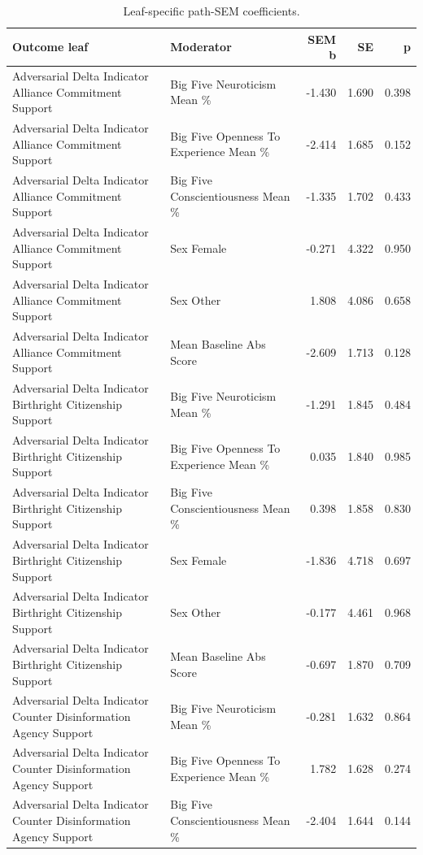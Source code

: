 \begin{table}[htbp]
\raggedright
\caption{Leaf-specific path-SEM coefficients.}
\label{tab:sempaths}
{
\footnotesize
\setlength{\tabcolsep}{4pt}
\renewcommand{\arraystretch}{1.08}
\begin{tabular}{llrrr}
\toprule
Outcome leaf & Moderator & SEM b & SE & p \\
\midrule
Adversarial Delta Indicator Alliance Commitment Support & Big Five Neuroticism Mean \% & -1.430 & 1.690 & 0.398 \\
Adversarial Delta Indicator Alliance Commitment Support & Big Five Openness To Experience Mean \% & -2.414 & 1.685 & 0.152 \\
Adversarial Delta Indicator Alliance Commitment Support & Big Five Conscientiousness Mean \% & -1.335 & 1.702 & 0.433 \\
Adversarial Delta Indicator Alliance Commitment Support & Sex Female & -0.271 & 4.322 & 0.950 \\
Adversarial Delta Indicator Alliance Commitment Support & Sex Other & 1.808 & 4.086 & 0.658 \\
Adversarial Delta Indicator Alliance Commitment Support & Mean Baseline Abs Score & -2.609 & 1.713 & 0.128 \\
Adversarial Delta Indicator Birthright Citizenship Support & Big Five Neuroticism Mean \% & -1.291 & 1.845 & 0.484 \\
Adversarial Delta Indicator Birthright Citizenship Support & Big Five Openness To Experience Mean \% & 0.035 & 1.840 & 0.985 \\
Adversarial Delta Indicator Birthright Citizenship Support & Big Five Conscientiousness Mean \% & 0.398 & 1.858 & 0.830 \\
Adversarial Delta Indicator Birthright Citizenship Support & Sex Female & -1.836 & 4.718 & 0.697 \\
Adversarial Delta Indicator Birthright Citizenship Support & Sex Other & -0.177 & 4.461 & 0.968 \\
Adversarial Delta Indicator Birthright Citizenship Support & Mean Baseline Abs Score & -0.697 & 1.870 & 0.709 \\
Adversarial Delta Indicator Counter Disinformation Agency Support & Big Five Neuroticism Mean \% & -0.281 & 1.632 & 0.864 \\
Adversarial Delta Indicator Counter Disinformation Agency Support & Big Five Openness To Experience Mean \% & 1.782 & 1.628 & 0.274 \\
Adversarial Delta Indicator Counter Disinformation Agency Support & Big Five Conscientiousness Mean \% & -2.404 & 1.644 & 0.144 \\

\end{tabular}}
\end{table}
